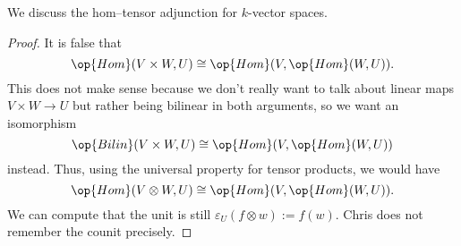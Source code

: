 \begin{exe}
	We discuss the hom--tensor adjunction for $k$-vector spaces.
\end{exe}
\begin{proof}
	It is false that
	\[\op{Hom}(V\times W,U)\cong\op{Hom}(V,\op{Hom}(W,U)).\]
	This does not make sense because we don't really want to talk about linear maps $V\times W\to U$ but rather being bilinear in both arguments, so we want an isomorphism
	\[\op{Bilin}(V\times W,U)\cong\op{Hom}(V,\op{Hom}(W,U))\]
	instead. Thus, using the universal property for tensor products, we would have
	\[\op{Hom}(V\otimes W,U)\cong\op{Hom}(V,\op{Hom}(W,U)).\]
	We can compute that the unit is still $\varepsilon_U(f\otimes w):=f(w)$. Chris does not remember the counit precisely.
\end{proof}

